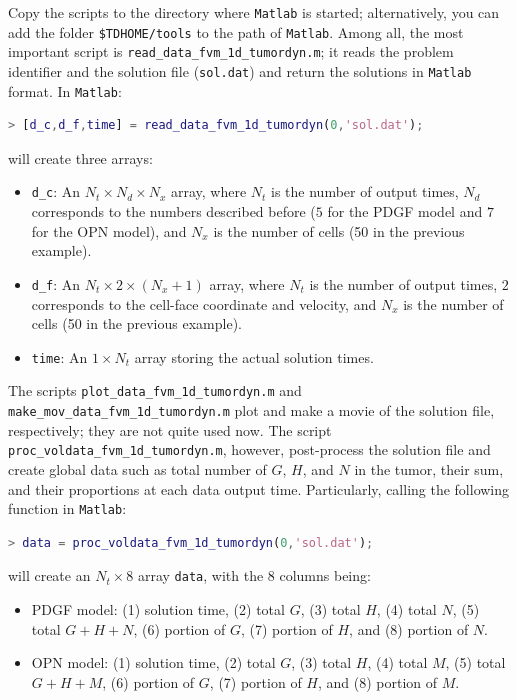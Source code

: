 \documentclass{amsproc}
\theoremstyle{definition}
\theoremstyle{remark}
\numberwithin{equation}{section}
\numberwithin{figure}{section}
\begin{document}
Copy the scripts to the directory where \texttt{Matlab} is started; alternatively, you can add the folder \texttt{\$TDHOME/tools} to the path of \texttt{Matlab}.
Among all, the most important script is \texttt{read\_data\_fvm\_1d\_tumordyn.m}; it reads the problem identifier and the solution file (\texttt{sol.dat}) and return the solutions in \texttt{Matlab} format.
In \texttt{Matlab}:
\begin{lstlisting}[backgroundcolor = \color{lightgray}, language = Matlab, xleftmargin = 0.1cm, framexleftmargin = 0.1cm]
> [d_c,d_f,time] = read_data_fvm_1d_tumordyn(0,'sol.dat');
\end{lstlisting}
will create three arrays:
\begin{itemize}
\item \texttt{d\_c}: An $N_t\times N_d\times N_x$ array, where $N_t$ is the number of output times, $N_d$ corresponds to the numbers described before ($5$ for the PDGF model and $7$ for the OPN model), and $N_x$ is the number of cells (50 in the previous example).
\item \texttt{d\_f}: An $N_t\times2\times(N_x+1)$ array, where $N_t$ is the number of output times, $2$ corresponds to the cell-face coordinate and velocity, and $N_x$ is the number of cells (50 in the previous example).
\item \texttt{time}: An $1\times N_t$ array storing the actual solution times.
\end{itemize}
The scripts \texttt{plot\_data\_fvm\_1d\_tumordyn.m} and \texttt{make\_mov\_data\_fvm\_1d\_tumordyn.m} plot and make a movie of the solution file, respectively; they are not quite used now.
The script \texttt{proc\_voldata\_fvm\_1d\_tumordyn.m}, however, post-process the solution file and create global data such as total number of $G$, $H$, and $N$ in the tumor, their sum, and their proportions at each data output time.
Particularly, calling the following function in \texttt{Matlab}:
\begin{lstlisting}[backgroundcolor = \color{lightgray}, language = Matlab, xleftmargin = 0.1cm, framexleftmargin = 0.1cm]
> data = proc_voldata_fvm_1d_tumordyn(0,'sol.dat');
\end{lstlisting}
will create an $N_t\times8$ array \texttt{data}, with the $8$ columns being: 
\begin{itemize}
  \item PDGF model: (1) solution time, (2) total $G$, (3) total $H$, (4) total $N$, (5) total $G+H+N$, (6) portion of $G$, (7) portion of $H$, and (8) portion of $N$.
  \item OPN model: (1) solution time, (2) total $G$, (3) total $H$, (4) total $M$, (5) total $G+H+M$, (6) portion of $G$, (7) portion of $H$, and (8) portion of $M$.
\end{itemize}
\end{document}
